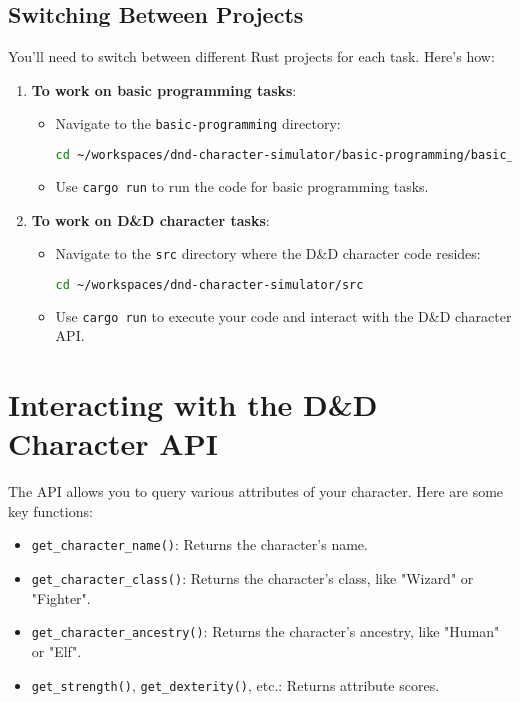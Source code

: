 \documentclass{article}
\begin{document}
	\subsection*{Switching Between Projects}
	You’ll need to switch between different Rust projects for each task. Here’s how:
	\begin{enumerate}
		\item \textbf{To work on basic programming tasks}:
		\begin{itemize}
			\item Navigate to the \texttt{basic-programming} directory:
			\begin{lstlisting}[language=bash]
				cd ~/workspaces/dnd-character-simulator/basic-programming/basic_syntax
			\end{lstlisting}
			\item Use \texttt{cargo run} to run the code for basic programming tasks.
		\end{itemize}
		
		\item \textbf{To work on D\&D character tasks}:
		\begin{itemize}
			\item Navigate to the \texttt{src} directory where the D\&D character code resides:
			\begin{lstlisting}[language=bash]
				cd ~/workspaces/dnd-character-simulator/src
			\end{lstlisting}
			\item Use \texttt{cargo run} to execute your code and interact with the D\&D character API.
		\end{itemize}
	\end{enumerate}
	
	\section*{Interacting with the D\&D Character API}
	The API allows you to query various attributes of your character. Here are some key functions:
	\begin{itemize}
		\item \texttt{get\_character\_name()}: Returns the character's name.
		\item \texttt{get\_character\_class()}: Returns the character's class, like "Wizard" or "Fighter".
		\item \texttt{get\_character\_ancestry()}: Returns the character's ancestry, like "Human" or "Elf".
		\item \texttt{get\_strength()}, \texttt{get\_dexterity()}, etc.: Returns attribute scores.
	\end{itemize}
	
\end{document}
